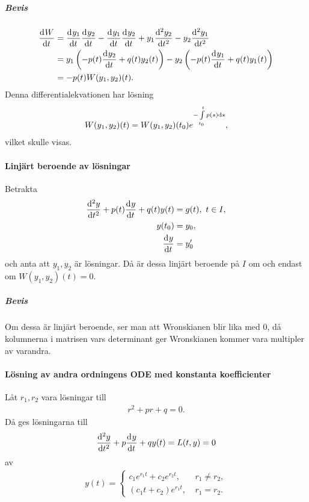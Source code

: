 \subparagraph{Bevis}
\begin{align*}
	\dv[]{W}{t} (t) &= \dv[]{y_{1}}{t} (t)\dv[]{y_{2}}{t} (t) - \dv[]{y_{1}}{t} (t)\dv[]{y_{2}}{t} (t) + y_{1}\dv[2]{y_{2}}{t} (t) - y_{2}\dv[2]{y_{1}}{t} (t) \\
	                &= y_{1}\left(-p(t)\dv[]{y_{2}}{t} (t) + q(t)y_{2}(t)\right) - y_{2}\left(-p(t)\dv[]{y_{1}}{t} (t) + q(t)y_{1}(t)\right) \\
	                &= -p(t)W(y_{1}, y_{2})(t).
\end{align*}
Denna differentialekvationen har lösning
\begin{align*}
	W(y_{1}, y_{2})(t) = W(y_{1}, y_{2})(t_{0})e^{-\int\limits_{t_{0}}^{t}p(s)\dd{s}},
\end{align*}
vilket skulle visas.

\paragraph{Linjärt beroende av lösningar}
Betrakta
\begin{align*}
	\deval[2]{y}{t}{t} + p(t)\deval{y}{t}{t} + q(t)y(t) &= g(t),\ t\in I, \\
	y(t_0)                                              &= y_0, \\
	\deval{y}{t}{t_{0}}                                 &= y'_{0}
\end{align*}
och anta att $y_{1}, y_{2}$ är lösningar. Då är dessa linjärt beroende på $I$ om och endast om $W(y_{1}, y_{2})(t) = 0$.

\subparagraph{Bevis}
Om dessa är linjärt beroende, ser man att Wronskianen blir lika med $0$, då kolumnerna i matrisen vars determinant ger Wronskianen kommer vara multipler av varandra.

\paragraph{Lösning av andra ordningens ODE med konstanta koefficienter}
Låt $r_1, r_2$ vara lösningar till
\begin{align*}
	r^2 + pr + q = 0.
\end{align*}
Då ges lösningarna till
\begin{align*}
	\dv[2]{y}{t} (t) + p\dv[]{y}{t} (t) + qy(t) = L(t, y) = 0
\end{align*}
av
\begin{align*}
	y(t) = 
	\begin{cases}
		c_1e^{r_1t} + c_2e^{r_2t},\ &r_1\neq r_2, \\
		(c_1t + c_2)e^{r_1t},\      &r_1 = r_2.
	\end{cases}
\end{align*}

